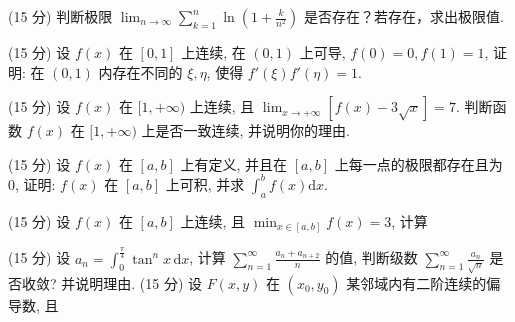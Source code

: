 \par{}
(15 分) 判断极限 $\lim_{n\to \infty}\sum_{k = 1}^{n}\ln \left(1 + \frac{k}{n^2}\right)$ 是否存在？若存在，求出极限值.\par
\par{}
(15 分) 设 $f(x)$ 在 $[0,1]$ 上连续, 在 $(0,1)$ 上可导, $f(0) = 0, f(1) = 1$, 证明: 在 $(0,1)$ 内存在不同的 $\xi, \eta$, 使得 $f'(\xi)f'(\eta) = 1$.\par
\par{}
(15 分) 设 $f(x)$ 在 $[1, +\infty)$ 上连续, 且 $\lim_{x \to +\infty} [f(x) - 3\sqrt{x}] = 7$. 判断函数 $f(x)$ 在 $[1, +\infty)$ 上是否一致连续, 并说明你的理由.\par
\par{}
(15 分) 设 $f(x)$ 在 $[a, b]$ 上有定义, 并且在 $[a, b]$ 上每一点的极限都存在且为 0, 证明: $f(x)$ 在 $[a, b]$ 上可积, 并求 $\int_{a}^{b} f(x) \mathrm{d}x$.\par
\par{}
\par{}
(15 分) 设 $f(x)$ 在 $[a, b]$ 上连续, 且 $\min_{x \in [a, b]} f(x) = 3$, 计算\par
\nopagebreak[4]
\par{}
\par{}
(15 分) 设 $a_{n} = \int_{0}^{\frac{\pi}{4}} \tan^{n} x \, \mathrm{d}x$, 计算 $\sum_{n=1}^{\infty} \frac{a_{n} + a_{n+2}}{n}$ 的值, 判断级数 $\sum_{n=1}^{\infty} \frac{a_{n}}{\sqrt{n}}$ 是否收敛? 并说明理由.
(15 分) 设 $F(x, y)$ 在 $(x_{0}, y_{0})$ 某邻域内有二阶连续的偏导数, 且\par
\nopagebreak[4]
